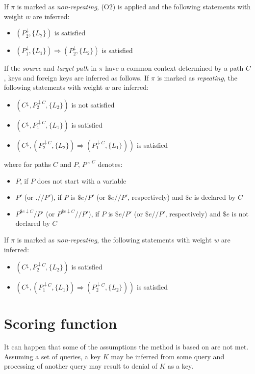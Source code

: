 If $\pi$ is marked as \emph{non-repeating}, (O2) is applied and the following statements with weight $w$ are inferred:
\begin{itemize}
\item $(P_2^{\downarrow}, \{L_2\})$ is satisfied
\item $(P_1^{\downarrow}, \{L_1\}) \Rightarrow (P_2^{\downarrow}, \{L_2\})$ is satisfied
\end{itemize}

If the \emph{source} and \emph{target path} in $\pi$ have a common context determined by a path $C$, keys and foreign keys are inferred as follows. If $\pi$ is marked as \emph{repeating}, the following statements with weight $w$ are inferred:
\begin{itemize}
\item $(C^{\downarrow}, P_2^{\downarrow C}, \{L_2\})$ is not satisfied
\item $(C^{\downarrow}, P_1^{\downarrow C}, \{L_1\})$ is satisfied
\item $(C^{\downarrow}, (P_2^{\downarrow C}, \{L_2\}) \Rightarrow (P_1^{\downarrow C}, \{L_1\}))$ is satisfied
\end{itemize}
where for paths $C$ and $P$, $P^{\downarrow C}$ denotes:
\begin{itemize}
\item $P$, if $P$ does not start with a variable
\item $P'$ (or $.//P'$), if $P$ is $\$e/P'$ (or $\$e//P'$, respectively) and $\$e$ is declared by $C$
\item $P^{\$e\downarrow C}/P'$ (or $P^{\$e\downarrow C}//P'$), if $P$ is $\$e/P'$ (or $\$e//P'$, respectively) and $\$e$ is not declared by $C$
\end{itemize}

If $\pi$ is marked as \emph{non-repeating}, the following statements with weight $w$ are inferred:
\begin{itemize}
\item $(C^{\downarrow}, P_2^{\downarrow C}, \{L_2\})$ is satisfied
\item $(C^{\downarrow}, (P_1^{\downarrow C}, \{L_1\}) \Rightarrow (P_2^{\downarrow C}, \{L_2\}))$ is satisfied
\end{itemize}

\section{Scoring function}
It can happen that some of the assumptions the method is based on are not met. Assuming a set of queries, a key $K$ may be inferred from some query and processing of another query may result to denial of $K$ as a key. 

